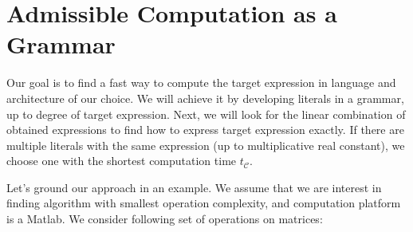 \section{Admissible Computation as a Grammar}\label{sec:grammars}

Our goal is to find a fast way to compute the target expression in
language and architecture of our choice.  We will achieve it by
developing literals in a grammar, up to degree of target
expression. Next, we will look for the linear combination of obtained
expressions to find how to express target expression exactly. If there
are multiple literals with the same expression (up to multiplicative real
constant), we choose one with the shortest computation time $t_\mathcal{C}$.

Let's ground our approach in an example. We assume that we are interest in
finding algorithm with smallest operation complexity, and computation platform
is a Matlab.  We consider following set of operations on matrices: 


